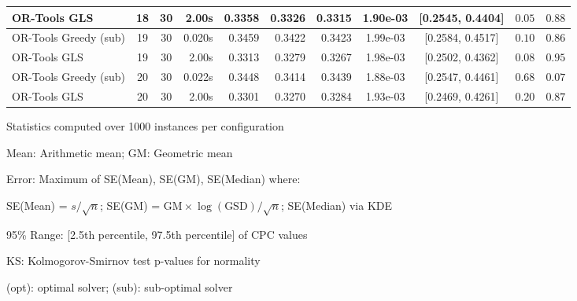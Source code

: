 \begin{table*}[htbp]
\begin{tabular}{@{}l c c r r r r c c c c@{}}
OR-Tools GLS & 18 & 30 & 2.00s & 0.3358 & 0.3326 & 0.3315 & 1.90e-03 & [0.2545, 0.4404] & $0.05$ & $0.88$ \\
\midrule
OR-Tools Greedy (sub) & 19 & 30 & 0.020s & 0.3459 & 0.3422 & 0.3423 & 1.99e-03 & [0.2584, 0.4517] & $0.10$ & $0.86$ \\
OR-Tools GLS & 19 & 30 & 2.00s & 0.3313 & 0.3279 & 0.3267 & 1.98e-03 & [0.2502, 0.4362] & $0.08$ & $0.95$ \\
\midrule
OR-Tools Greedy (sub) & 20 & 30 & 0.022s & 0.3448 & 0.3414 & 0.3439 & 1.88e-03 & [0.2547, 0.4461] & $0.68$ & $0.07$ \\
OR-Tools GLS & 20 & 30 & 2.00s & 0.3301 & 0.3270 & 0.3284 & 1.93e-03 & [0.2469, 0.4261] & $0.20$ & $0.87$ \\
\bottomrule
\end{tabular}
\begin{tablenotes}
\small
\item Statistics computed over 1000 instances per configuration
\item Mean: Arithmetic mean; GM: Geometric mean
\item Error: Maximum of SE(Mean), SE(GM), SE(Median) where:
\item \quad SE(Mean) = $s/\sqrt{n}$; SE(GM) = $\text{GM} \times \log(\text{GSD})/\sqrt{n}$; SE(Median) via KDE
\item 95\% Range: [2.5th percentile, 97.5th percentile] of CPC values
\item KS: Kolmogorov-Smirnov test p-values for normality
\item (opt): optimal solver; (sub): sub-optimal solver
\end{tablenotes}
\end{table*}
